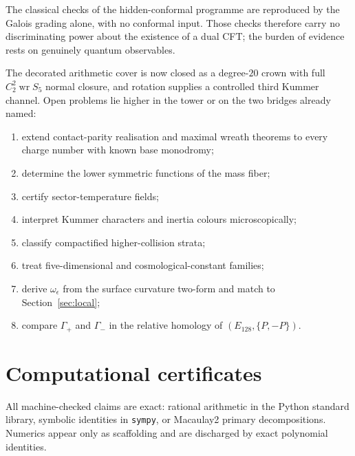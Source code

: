 \documentclass[11pt,a4paper]{article}
\theoremstyle{definition}
\theoremstyle{remark}
\newcommand{\wrp}{\mathop{\mathrm{wr}}}
\begin{document}
The classical checks of the hidden-conformal programme are reproduced by the
Galois grading alone, with no conformal input. Those checks therefore carry no
discriminating power about the existence of a dual CFT; the burden of evidence
rests on genuinely quantum observables.

The decorated arithmetic cover is now closed as a degree-\(20\) crown with full
\(C_2^2\wrp S_5\) normal closure, and rotation supplies a controlled third
Kummer channel. Open problems lie higher in the tower or on the two bridges
already named:
\begin{enumerate}
\item extend contact-parity realisation and maximal wreath theorems to every
charge number with known base monodromy;
\item determine the lower symmetric functions of the mass fiber;
\item certify sector-temperature fields;
\item interpret Kummer characters and inertia colours microscopically;
\item classify compactified higher-collision strata;
\item treat five-dimensional and cosmological-constant families;
\item derive \(\omega_\epsilon\) from the surface curvature two-form and match
to Section~\ref{sec:local};
\item compare \(\Gamma_+\) and \(\Gamma_-\) in the relative homology of
\((E_{128},\{P,-P\})\).
\end{enumerate}

\appendix
\section{Computational certificates}
\label{app:certs}

All machine-checked claims are exact: rational arithmetic in the Python
standard library, symbolic identities in \texttt{sympy}, or Macaulay2 primary
decompositions. Numerics appear only as scaffolding and are discharged by exact
polynomial identities.
\end{document}
